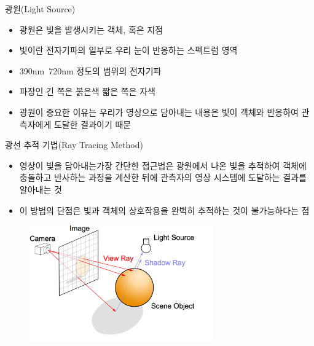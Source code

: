 \documentclass{beamer}
\begin{document}
\begin{frame}{광원(Light Source)}

\begin{itemize}
\item 광원은 빛을 발생시키는 객체, 혹은 지점
\item 빛이란 전자기파의 일부로 우리 눈이 반응하는 스펙트럼 영역
\item 390nm~720nm 정도의 범위의 전자기파
\item 파장인 긴 쪽은 붉은색 짧은 쪽은 자색
\item 광원이 중요한 이유는 우리가 영상으로 담아내는 내용은 빛이 객체와 반응하여 관측자에게 도달한 결과이기 때문
\end{itemize}

\end{frame}


\begin{frame}{광선 추적 기법(Ray Tracing Method)}

\begin{itemize}
\item 영상이 빛을 담아내는가장 간단한 접근법은 광원에서 나온 빛을 추적하여 객체에 충돌하고 반사하는 과정을 계산한 뒤에 관측자의 영상 시스템에 도달하는 결과를 알아내는 것
\item 이 방법의 단점은 빛과 객체의 상호작용을 완벽히 추적하는 것이 불가능하다는 점
\end{itemize}

\begin{figure}
    \includegraphics[height=5cm]{OGL_intro/raytracingConcept.png}
\end{figure}

\end{frame}
\end{document}
